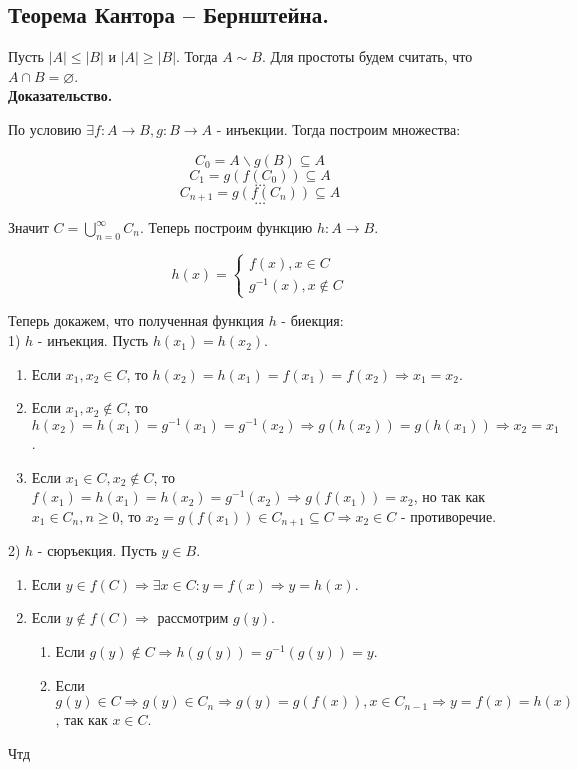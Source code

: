 \subsection{Теорема Кантора – Бернштейна.}
Пусть $|A| \leq |B|$ и $|A| \geq |B|$. Тогда $A \sim B$. Для простоты будем считать, что $A \cap B = \varnothing$.\\

\noindent \textbf{Доказательство.}

По условию $\exists f : A \to B, g : B \to A$ - инъекции. Тогда построим множества:

\begin{center}
    $$C_0 = A \backslash g(B) \subseteq A$$
    $$C_1 = g(f(C_0)) \subseteq A$$
    $$\dots$$
    $$C_{n + 1} = g(f(C_n)) \subseteq A$$
    $$\dots$$
\end{center}

Значит $C = \bigcup\limits_{n = 0}^{\infty} C_n$. Теперь построим функцию $h : A \to B$.

\begin{equation*}
    h(x) = \begin{cases}
        f(x), x \in C\\
        g^{-1}(x), x \notin C
    \end{cases}
\end{equation*}

Теперь докажем, что полученная функция $h$ - биекция:\\

1) $h$ - инъекция. Пусть $h(x_1) = h(x_2)$.

\begin{enumerate}
    \item Если $x_1, x_2 \in C$, то $h(x_2) = h(x_1) = f(x_1) = f(x_2) \Rightarrow x_1 = x_2$.
    \item Если $x_1, x_2 \notin C$, то $h(x_2) = h(x_1) = g^{-1}(x_1) = g^{-1}(x_2) \Rightarrow g(h(x_2)) = g(h(x_1)) \Rightarrow x_2 = x_1$.
    \item Если $x_1 \in C, x_2 \notin C$, то $f(x_1) = h(x_1) = h(x_2) = g^{-1}(x_2) \Rightarrow g(f(x_1)) = x_2$, но так как $x_1 \in C_n, n\geq 0$,
    то $x_2 = g(f(x_1)) \in C_{n + 1} \subseteq C \Rightarrow x_2 \in C$ - противоречие.
\end{enumerate}

2) $h$ - сюръекция. Пусть $y \in B$.

\begin{enumerate}
    \item Если $y \in f(C) \Rightarrow \exists x \in C : y = f(x) \Rightarrow y = h(x)$.
    \item Если $y \notin f(C) \Rightarrow$ рассмотрим $g(y)$.
    \begin{enumerate}
        \item Если $g(y) \notin C \Rightarrow h(g(y)) = g^{-1}(g(y)) = y$.
        \item Если $g(y) \in C \Rightarrow g(y) \in C_n \Rightarrow g(y) = g(f(x)), x \in C_{n - 1} \Rightarrow y = f(x) = h(x)$, так как $x \in C$.
    \end{enumerate}
\end{enumerate}

Чтд

